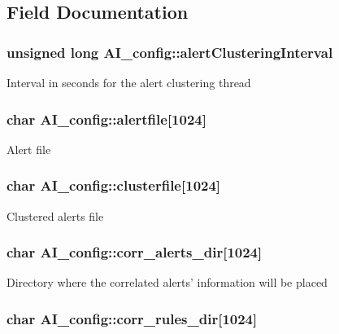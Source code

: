 \subsection{Field Documentation}
\hypertarget{structAI__config_a7d0d098b8263aa3d8415b11d1ec7f93d}{
\subsubsection[{alertClusteringInterval}]{\setlength{\rightskip}{0pt plus 5cm}unsigned long {\bf AI\_\-config::alertClusteringInterval}}}
\label{structAI__config_a7d0d098b8263aa3d8415b11d1ec7f93d}
Interval in seconds for the alert clustering thread \hypertarget{structAI__config_a2efa9590d7eea6dce8b5dd9aa76ed8ca}{
\subsubsection[{alertfile}]{\setlength{\rightskip}{0pt plus 5cm}char {\bf AI\_\-config::alertfile}\mbox{[}1024\mbox{]}}}
\label{structAI__config_a2efa9590d7eea6dce8b5dd9aa76ed8ca}
Alert file \hypertarget{structAI__config_a6da02a3f7116fd3810a41b738e8883a3}{
\subsubsection[{clusterfile}]{\setlength{\rightskip}{0pt plus 5cm}char {\bf AI\_\-config::clusterfile}\mbox{[}1024\mbox{]}}}
\label{structAI__config_a6da02a3f7116fd3810a41b738e8883a3}
Clustered alerts file \hypertarget{structAI__config_ae68f5489e2ec9ea1408f98fe36d050c9}{
\subsubsection[{corr\_\-alerts\_\-dir}]{\setlength{\rightskip}{0pt plus 5cm}char {\bf AI\_\-config::corr\_\-alerts\_\-dir}\mbox{[}1024\mbox{]}}}
\label{structAI__config_ae68f5489e2ec9ea1408f98fe36d050c9}
Directory where the correlated alerts' information will be placed \hypertarget{structAI__config_ab7ea93bbe72b85c4019b4f5656ad62fc}{
\subsubsection[{corr\_\-rules\_\-dir}]{\setlength{\rightskip}{0pt plus 5cm}char {\bf AI\_\-config::corr\_\-rules\_\-dir}\mbox{[}1024\mbox{]}}}
